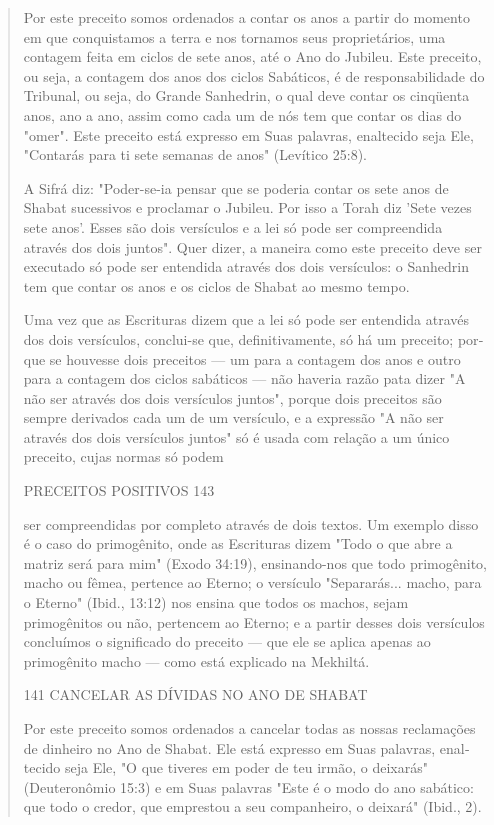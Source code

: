 \begin{quote}
Por este preceito somos ordenados a contar os anos a partir do mo­mento
em que conquistamos a terra e nos tornamos seus proprietários, uma
contagem feita em ciclos de sete anos, até o Ano do Jubileu. Este
preceito, ou seja, a contagem dos anos dos ciclos Sabáticos, é de
responsabilidade do Tribu­nal, ou seja, do Grande Sanhedrin, o qual deve
contar os cinqüenta anos, ano a ano, assim como cada um de nós tem que
contar os dias do "omer". Este preceito está expresso em Suas palavras,
enaltecido seja Ele, "Contarás para ti sete semanas de anos" (Levítico
25:8).

A Sifrá diz: "Poder-se-ia pensar que se poderia contar os sete anos de
Shabat sucessivos e proclamar o Jubileu. Por isso a Torah diz 'Sete
vezes sete anos'. Esses são dois versículos e a lei só pode ser
compreendida através dos dois juntos". Quer dizer, a maneira como este
preceito deve ser executado só pode ser entendida através dos dois
versículos: o Sanhedrin tem que contar os anos e os ciclos de Shabat ao
mesmo tempo.

Uma vez que as Escrituras dizem que a lei só pode ser entendida atra­vés
dos dois versículos, conclui-se que, definitivamente, só há um preceito;
por­que se houvesse dois preceitos --- um para a contagem dos anos e
outro para a contagem dos ciclos sabáticos --- não haveria razão pata
dizer "A não ser atra­vés dos dois versículos juntos", porque dois
preceitos são sempre derivados cada um de um versículo, e a expressão "A
não ser através dos dois versículos juntos" só é usada com relação a um
único preceito, cujas normas só podem

PRECEITOS POSITIVOS 143

ser compreendidas por completo através de dois textos. Um exemplo disso
é o caso do primogênito, onde as Escrituras dizem "Todo o que abre a
matriz será para mim" (Exodo 34:19), ensinando-nos que todo primogênito,
macho ou fêmea, pertence ao Eterno; o versículo "Separarás... macho,
para o Eterno" (Ibid., 13:12) nos ensina que todos os machos, sejam
primogênitos ou não, per­tencem ao Eterno; e a partir desses dois
versículos concluímos o significado do preceito --- que ele se aplica
apenas ao primogênito macho --- como está explicado na Mekhiltá.

141 CANCELAR AS DÍVIDAS NO ANO DE SHABAT

Por este preceito somos ordenados a cancelar todas as nossas
recla­mações de dinheiro no Ano de Shabat. Ele está expresso em Suas
palavras, enal­tecido seja Ele, "O que tiveres em poder de teu irmão, o
deixarás" (Deuteronô­mio 15:3) e em Suas palavras "Este é o modo do ano
sabático: que todo o cre­dor, que emprestou a seu companheiro, o
deixará" (Ibid., 2).


\end{quote}
